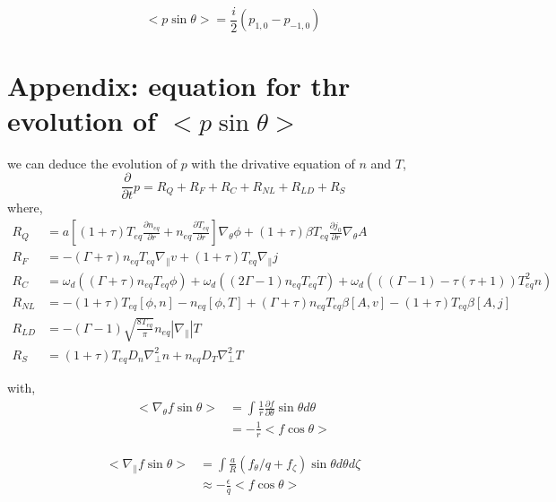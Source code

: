 \documentclass[11pt,a4paper]{article}
\begin{document}
	\begin{equation}
		<p\sin\theta>=\frac{i}{2}(p_{1,0}-p_{-1,0})
	\end{equation}
	

\section{Appendix: equation for thr evolution of $<p\sin\theta>$}
	we can deduce the evolution of $p$ with the drivative equation of $n$ and $T$,
	\begin{equation}
		\frac{\partial}{\partial{t}}p
		=R_Q+R_F+R_C+R_{NL}+R_{LD}+R_{S}
	\end{equation}
	where,
	\begin{equation}
	\begin{aligned}
	R_Q&=
	a[(1+\tau)T_{eq}\frac{\partial{n_{eq}}}{\partial{r}}+n_{eq}\frac{\partial{T_{eq}}}{\partial{r}}]\nabla_\theta\phi
	+(1+\tau)\beta{T_{eq}}\frac{\partial{j_0}}{\partial{r}}\nabla_\theta{A}	\\
	R_F&=
	-(\Gamma+\tau)n_{eq}T_{eq}\nabla_{\parallel}v
	+(1+\tau)T_{eq}\nabla_\parallel{j}	\\
	R_C&=
	\omega_d((\Gamma+\tau)n_{eq}T_{eq}\phi)
	+\omega_d((2\Gamma-1)n_{eq}T_{eq}T)
	+\omega_d(((\Gamma-1)-\tau(\tau+1))T_{eq}^2n)	\\
	R_{NL}&=
	-(1+\tau)T_{eq}[\phi,n]
	-n_{eq}[\phi,T]
	+(\Gamma+\tau)n_{eq}T_{eq}\beta[A,v]
	-(1+\tau)T_{eq}\beta[A,j]	\\
	R_{LD}&=
	-(\Gamma-1)\sqrt{\frac{8T_{eq}}{\pi}}n_{eq}|\nabla_\parallel|T	\\
	R_{S}&=
	(1+\tau)T_{eq}D_n\nabla_\perp^2n
	+n_{eq}D_T\nabla_\perp^2{T}
	\end{aligned}
	\end{equation}
	
	with,
	\begin{equation}
	\begin{aligned}
		<\nabla_\theta{f}\sin\theta>
		&=\int \frac{1}{r}\frac{\partial{f}}{\partial\theta}\sin\theta{d\theta}\\
		&=-\frac{1}{r}<f\cos\theta>
	\end{aligned}
	\end{equation}

	\begin{equation}
	\begin{aligned}
		<\nabla_\parallel{f}\sin\theta>
		&=\int \frac{a}{R}(f_\theta/q+f_\zeta)\sin\theta{d\theta}{d\zeta}\\
		&\approx-\frac{\epsilon}{q}<f\cos\theta>
	\end{aligned}		
	\end{equation}
\end{document}
